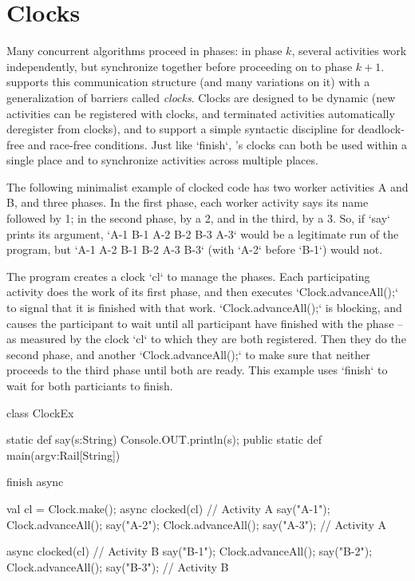 \chapter{Clocks}\label{XtenClocks}

Many concurrent algorithms proceed in phases: in phase {$k$}, several
activities work independently, but synchronize together before proceeding on
to phase {$k+1$}. \Xten{} supports this communication structure (and many
variations on it) with a generalization of barriers 
called {\em clocks}. Clocks are designed to be dynamic (new activities
can be registered with clocks, and terminated activities automatically
deregister from clocks), and to support a simple syntactic discipline
for deadlock-free and race-free conditions.  Just like \xcd`finish`,
\Xten's clocks can both be used within a single place and to synchronize
activities across multiple places.

The following minimalist example of clocked code has two worker activities A
and B, and three phases. In the first phase, each worker activity says its
name followed by 1; in the second phase, by a 2, and in the third, by a 3.  
So, if \xcd`say` prints its argument, 
\xcd`A-1 B-1 A-2 B-2 B-3 A-3`
would be a legitimate run of the program, but
\xcd`A-1 A-2 B-1 B-2 A-3 B-3`
(with \xcd`A-2` before \xcd`B-1`) would not.

The program creates a clock \xcd`cl` to manage the phases.  Each participating
activity does
the work of its first phase, and then executes \xcd`Clock.advanceAll();` to
signal that it 
is finished with that work. \xcd`Clock.advanceAll();` is blocking, and causes the participant to
wait until all participant have finished with the phase -- as measured by the
clock \xcd`cl` to which they are both registered.  
Then they do the second phase, and another \xcd`Clock.advanceAll();` to make sure that
neither proceeds to the third phase until both are ready.  This example uses
\xcd`finish` to wait for both particiants to finish.  




\begin{xten}
class ClockEx {
  static def say(s:String) {
    Console.OUT.println(s); 
  }
  public static def main(argv:Rail[String]) {
    finish async{
      val cl = Clock.make();
      async clocked(cl) {// Activity A
        say("A-1");
        Clock.advanceAll();
        say("A-2");
        Clock.advanceAll();
        say("A-3"); 
      }// Activity A

      async clocked(cl) {// Activity B
        say("B-1");
        Clock.advanceAll();
        say("B-2");
        Clock.advanceAll();
        say("B-3"); 
      }// Activity B
    }
  }
 }
\end{xten}

